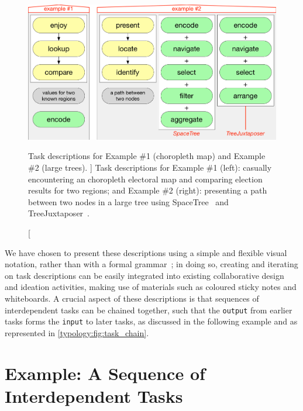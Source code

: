 \begin{figure}
    \centering
    \includegraphics[width=\textwidth]{figures/task_examples.pdf}
    \caption
    [
        Task descriptions for Example \#1 (choropleth map) and Example \#2 (large trees).
    ]
    {
        Task descriptions for Example \#1 (left): casually encountering an choropleth electoral map and comparing election results for two regions; and Example \#2 (right): presenting a path between two nodes in a large tree using SpaceTree~\cite{Grosjean2002} and TreeJuxtaposer~\cite{Munzner2003}.
    }
    \label{typology:fig:task_examples}
\end{figure}


We have chosen to present these descriptions using a simple and flexible visual notation, rather than with a formal grammar~\cite{Andrienko2006,Lammarsch2012,Schulz2013,Tweedie1997,Wilkinson2005}; in doing so, creating and iterating on task descriptions can be easily integrated into existing collaborative design and ideation activities, making use of materials such as coloured sticky notes and whiteboards.
A crucial aspect of these descriptions is that sequences of interdependent tasks can be chained together, such that the {\tt output} from earlier tasks forms the {\tt input} to later tasks, as discussed in the following example and as represented in \autoref{typology:fig:task_chain}.


\section{Example: A Sequence of Interdependent Tasks}
\label{typology:results}

